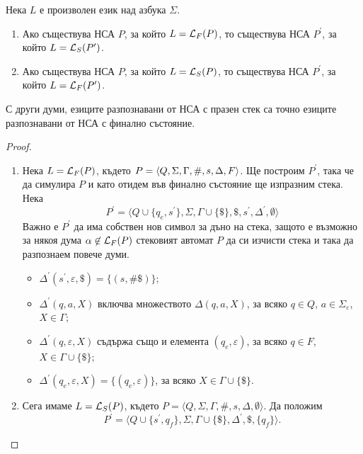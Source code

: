 \begin{thm}
  Нека $L$ е произволен език над азбука $\Sigma$.
  \begin{enumerate}[1)]
  \item 
    Ако съществува НСА $P$, за който $L = \mathcal{L}_F(P)$, то съществува НСА $P^\prime$, за който $L = \mathcal{L}_S(P^\prime)$.
  \item
    Ако съществува НСА $P$, за който $L = \mathcal{L}_S(P)$, то съществува НСА $P^\prime$, за който $L = \mathcal{L}_F(P^\prime)$.
  \end{enumerate}
  С други думи, езиците разпознавани от НСА с празен стек са точно езиците разпознавани от НСА с финално състояние.
\end{thm}
\begin{proof}
  \begin{enumerate}[1)]
  \item 
    Нека $L = \mathcal{L}_F(P)$, където $P = \langle{Q,\Sigma,\Gamma,\#,s,\Delta,F}\rangle$.
    Ще построим $P^\prime$, така че да симулира $P$ и като отидем във финално състояние ще изпразним стека.
    Нека
    \[P^\prime = \langle{Q\cup\{q_e,s^\prime\},\Sigma,\Gamma \cup \{\$\},\$,s^\prime,\Delta^\prime,\emptyset}\rangle\]
    Важно е $P^\prime$ да има собствен нов символ за дъно на стека, защото е възможно за някоя дума $\alpha \not\in \mathcal{L}_F(P)$
    стековият автомат $P$ да си изчисти стека и така да разпознаем повече думи.
    \begin{itemize}
    \item 
      $\Delta^\prime(s^\prime,\varepsilon,\$) = \{(s,\#\$)\}$;
    \item
      $\Delta^\prime(q,a,X)$ включва множеството $\Delta(q,a,X)$, за всяко $q\in Q$, $a\in\Sigma_\varepsilon$, $X\in\Gamma$;
    \item
      $\Delta^\prime(q,\varepsilon,X)$ съдържа също и елемента $(q_e,\varepsilon)$, за всяко $q\in F$, $X \in \Gamma \cup \{\$\}$;
    \item
      $\Delta^\prime(q_e,\varepsilon,X) = \{(q_e,\varepsilon)\}$, за всяко $X \in \Gamma \cup \{\$\}$.
    \end{itemize}
  \item
    Сега имаме $L = \mathcal{L}_S(P)$, където $P = \langle{Q,\Sigma,\Gamma,\#,s,\Delta,\emptyset}\rangle$. 
    Да положим
    \[P^\prime = \langle{Q\cup\{s^\prime,q_f\}, \Sigma, \Gamma \cup \{\$\}, \Delta^\prime, \$, \{q_f\}}\rangle.\]

\end{enumerate}
\end{proof}
